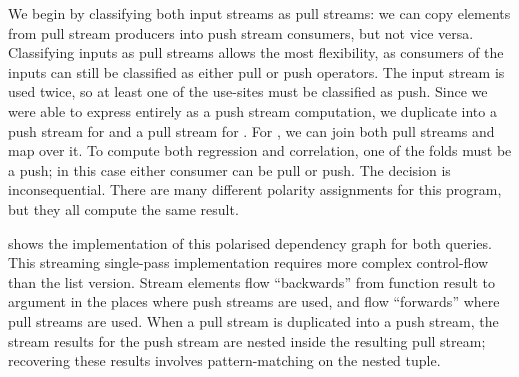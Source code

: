 % 

We begin by classifying both input streams as pull streams: we can copy elements from pull stream producers into push stream consumers, but not vice versa.
Classifying inputs as pull streams allows the most flexibility, as consumers of the inputs can still be classified as either pull or push operators.
The \Hs@stock@ input stream is used twice, so at least one of the use-sites must be classified as push.
Since we were able to express \Hs@priceOverTime@ entirely as a push stream computation, we duplicate \Hs@stock@ into a push stream for \Hs@priceOverTime@ and a pull stream for \Hs@priceOverMarket@.
For \Hs@priceOverMarket@, we can join both pull streams and map over it.
To compute both regression and correlation, one of the folds must be a push; in this case either consumer can be pull or push.
The decision is inconsequential.
There are many different polarity assignments for this program, but they all compute the same result.

 shows the implementation of this polarised dependency graph for both queries.
This streaming single-pass implementation requires more complex control-flow than the list version.
Stream elements flow ``backwards'' from function result to argument in the places where push streams are used, and flow ``forwards'' where pull streams are used.
When a pull stream is duplicated into a push stream, the stream results for the push stream are nested inside the resulting pull stream; recovering these results involves pattern-matching on the nested tuple.


